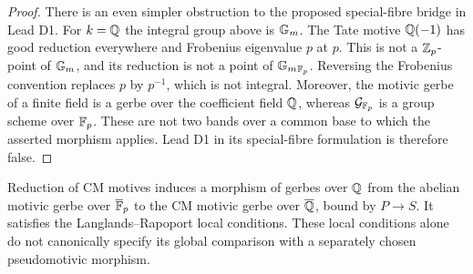 \begin{proof}
There is an even simpler obstruction to the proposed special-fibre
bridge in Lead D1.  For $k=\mathbb Q$ the integral group above is ${\mathbb G_m}$.
The Tate motive $\mathbb Q(-1)$ has good reduction everywhere and Frobenius
eigenvalue $p$ at $p$.  This is not a $\mathbb Z_p$-point of ${\mathbb G_m}$, and its
reduction is not a point of ${\mathbb G_m}_{\mathbb F_p}$.  Reversing the Frobenius
convention replaces $p$ by $p^{-1}$, which is not integral.  Moreover,
the motivic gerbe of a finite field is a gerbe over the coefficient
field $\mathbb Q$, whereas $\mathcal G_{\mathbb F_p}$ is a group scheme over
$\mathbb F_p$.  These are not two bands over a common base to which the
asserted morphism applies.  Lead D1 in its special-fibre formulation
is therefore false.
\end{proof}

\begin{proposition}
\label{prop:d-cm-gerbe-reduction}
Reduction of CM motives induces a morphism of gerbes over $\mathbb Q$
from the abelian motivic gerbe over $\overline{\mathbb F}_p$ to the CM
motivic gerbe over $\overline{\mathbb Q}$, bound by $P\to S$.  It satisfies
the Langlands--Rapoport local conditions.  These local conditions
alone do not canonically specify its global comparison with a
separately chosen pseudomotivic morphism.
\end{proposition}


